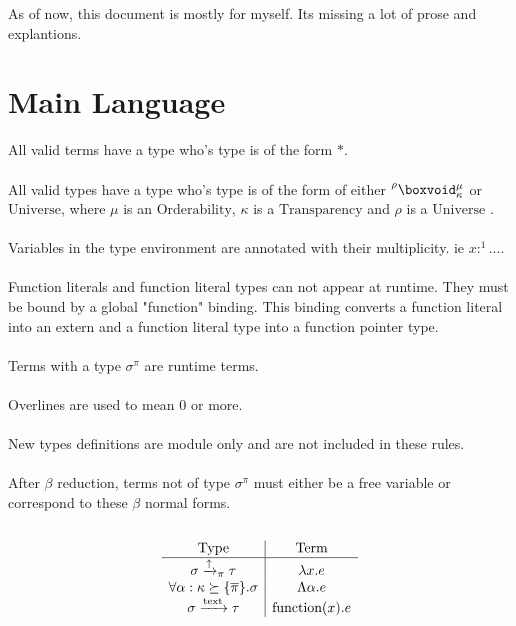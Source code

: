 \documentclass {article}
\begin{document}
As of now, this document is mostly for myself. Its missing a lot of prose and explantions. \\

\tableofcontents


\section{Main Language}
All valid terms have a type who's type is of the form $ * $. \\
\\
All valid types have a type who's type is of the form of either $ \prescript {\rho} {} \boxvoid^\mu_{\kappa} $ or $ \text{Universe} $,
where $ \mu $ is an $ \text{Orderability} $, $ \kappa $ is a $ \text{Transparency}$
and $ \rho $ is a $ \text {Universe} $ . \\
\\
Variables in the type environment are annotated with their multiplicity. ie $ x :^1 ... $. \\
\\
Function literals and function literal types can not appear at runtime. They must be bound by a global "function" binding.
This binding converts a function literal into an extern and a function literal type into a function pointer type. \\
\\
Terms with a type $ \sigma^\pi $ are runtime terms. \\
\\
Overlines are used to mean 0 or more. \\
\\
New types definitions are module only and are not included in these rules. \\
\\
After $ \beta $ reduction, terms not of type $ \sigma^\pi $ must either be a free variable or correspond to these $ \beta $ normal forms. \\
\\
\begin{gather*}
\begin{array}{c | c}
\text{Type} & \text{Term} \\
\hline
\sigma \xrightarrow{\uparrow}_\pi \tau & \lambda x. e \\
\forall \alpha : \kappa \succeq \{ \overline \pi \}. \sigma & \Lambda \alpha. e  \\
\sigma \xrightarrow{\text{text}} \tau & \text{function}(x). e \\
\end{array}
\\
\end{gather*}
\end{document}
